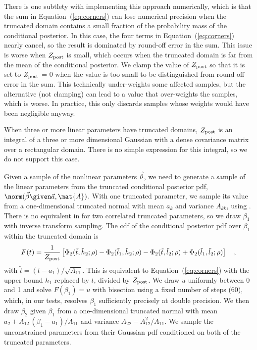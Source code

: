 \documentclass[twocolumn]{AASTeX7/aastex701}
\begin{document}
There is one subtlety with implementing this approach numerically, which is that the sum
in Equation~(\ref{eq:corners}) can lose numerical precision when the truncated domain
contains a small fraction of the probability mass of the conditional posterior.
In this case, the four terms in Equation~(\ref{eq:corners}) nearly cancel, so the result
is dominated by round-off error in the sum.
This issue is worse when $Z_{\rm post}$ is small, which occurs when the truncated domain
is far from the mean of the conditional posterior.
We clamp the value of $Z_{\rm post}$ so that it is set to $Z_{\rm post}$ = 0 when the
value is too small to be distinguished from round-off error in the sum.
This technically under-weights some affected samples, but the alternative (not clamping)
can lead to a value that over-weights the samples, which is worse.
In practice, this only discards samples whose weights would have been negligible anyway.

When three or more linear parameters have truncated domains, $Z_{\rm post}$
is an integral of a three or more dimensional Gaussian with a dense covariance matrix
over a rectangular domain.
There is no simple expression for this integral, so we do not support this case.

Given a sample of the nonlinear parameters $\vec{\theta}$, we need to generate a sample
of the linear parameters from the truncated conditional posterior pdf,
$\norm(\vec{\beta} \given \vec{a}, \mat{A})$.
With one truncated parameter, we sample its value from a one-dimensional truncated
normal with mean $a_k$ and variance $A_{kk}$, using .
There is no equivalent in  for two correlated truncated parameters, so
we draw $\beta_1$ with inverse transform sampling.
The cdf of the conditional posterior pdf over $\beta_1$ within the truncated domain is
\begin{equation}
  F(t) = \frac{1}{Z_{\rm post}} \left[
    \Phi_2(\tilde{t}, \tilde{h}_2; \rho)
    - \Phi_2(\tilde{l}_1, \tilde{h}_2; \rho)
    - \Phi_2(\tilde{t}, \tilde{l}_2; \rho)
    + \Phi_2(\tilde{l}_1, \tilde{l}_2; \rho) \right]
  \quad ,
\end{equation}
with $\tilde{t} = (t - a_1)/\sqrt{A_{11}}$.
This is equivalent to Equation~(\ref{eq:corners}) with the upper bound $h_1$ replaced by
$t$, divided by $Z_{\rm post}$.
We draw $u$ uniformly between 0 and 1 and solve $F(\beta_1) = u$ with bisection using a
fixed number of steps (60), which, in our tests, resolves $\beta_1$ sufficiently
precisely at double precision.
We then draw $\beta_2$ given $\beta_1$ from a one-dimensional truncated normal with mean
$a_2 + A_{12}\,(\beta_1 - a_1)/A_{11}$ and variance $A_{22} - A_{12}^2/A_{11}$.
We sample the unconstrained parameters from their Gaussian pdf conditioned on both of
the truncated parameters.



{}
\end{document}
